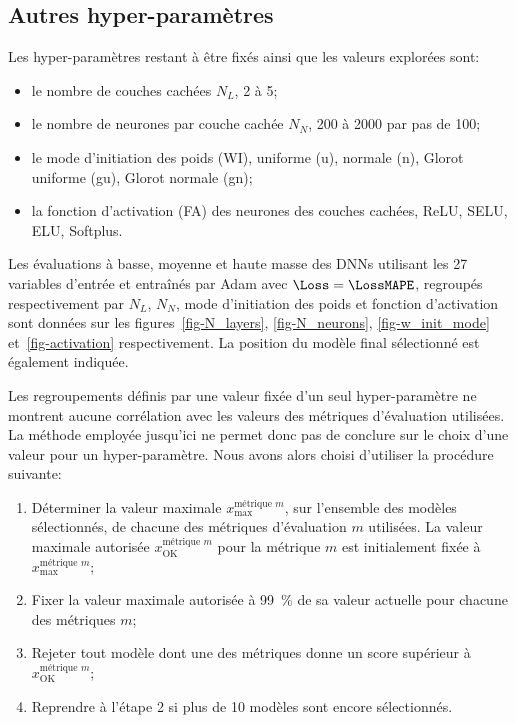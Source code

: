 \subsection{Autres hyper-paramètres}\label{chapter-ML-section-hyperparameters-others}
Les hyper-paramètres restant à être fixés ainsi que les valeurs explorées sont:
\begin{itemize}
\item le nombre de couches cachées $N_L$, 2 à 5;
\item le nombre de neurones par couche cachée $N_N$, \num{200} à \num{2000} par pas de \num{100};
\item le mode d'initiation des poids (WI), uniforme (u), normale (n), Glorot uniforme (gu), Glorot normale (gn);
\item la fonction d'activation (FA) des neurones des couches cachées, ReLU, SELU, ELU, Softplus.
\end{itemize}
Les évaluations
à basse, moyenne et haute masse
des DNNs
utilisant les 27 variables d'entrée
et
entraînés par Adam avec $\Loss=\LossMAPE$,
regroupés respectivement par
$N_L$, $N_N$, mode d'initiation des poids et fonction d'activation
sont données sur les
figures~\ref{fig-N_layers}, \ref{fig-N_neurons}, \ref{fig-w_init_mode} et~\ref{fig-activation} respectivement.
La position du modèle final sélectionné est également indiquée.
\def\localHP{N_layers}
\def\localHPlong{$N_L$}

\def\localHP{N_neurons}
\def\localHPlong{$N_N$}

\def\localHP{w_init_mode}
\def\localHPlong{le mode d'initiation des poids}

\def\localHP{activation}
\def\localHPlong{la fonction d'activation}

\par
Les regroupements définis par une valeur fixée d'un seul hyper-paramètre ne montrent aucune corrélation
avec les valeurs des métriques d'évaluation utilisées.
La méthode employée jusqu'ici ne permet donc pas de conclure sur le choix d'une valeur pour un hyper-paramètre.
Nous avons alors choisi d'utiliser la procédure suivante:
\begin{enumerate}
\item Déterminer la valeur maximale $x_\text{max}^\text{métrique $m$}$, sur l'ensemble des modèles sélectionnés, de chacune des métriques d'évaluation $m$ utilisées.
La valeur maximale autorisée $x_\text{OK}^\text{métrique $m$}$ pour la métrique $m$ est initialement fixée à $x_\text{max}^\text{métrique $m$}$;
\item Fixer la valeur maximale autorisée à \SI{99}{\%} de sa valeur actuelle pour chacune des métriques $m$;
\item Rejeter tout modèle dont une des métriques donne un score supérieur à $x_\text{OK}^\text{métrique $m$}$;
\item Reprendre à l'étape 2 si plus de 10 modèles sont encore sélectionnés.
\end{enumerate}
